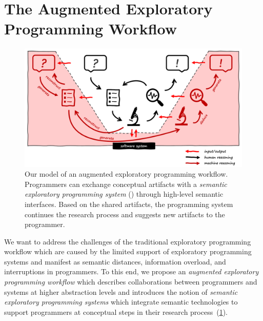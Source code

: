 
\section{The Augmented Exploratory Programming Workflow}
\label{sec:approach/workflow}

\begin{figure}
	\centering
	\includegraphics[width=\textwidth]{01_workflow/workflow.png}
	\caption[Our model of an \emph{augmented exploratory programming workflow}.]{
		Our model of an augmented exploratory programming workflow.
		Programmers can exchange conceptual artifacts with a \emph{semantic exploratory programming system} (\bold{\textcolor{red}{red}}) through high-level semantic interfaces.
		Based on the shared artifacts, the programming system continues the research process and suggests new artifacts to the programmer.
	}
	\label{fig:approach/workflow/workflow}
\end{figure}

We want to address the challenges of the traditional exploratory programming workflow which are caused by the limited support of exploratory programming systems and manifest as semantic distances, information overload, and interruptions in programmers.
To this end, we propose an \emph{augmented exploratory programming workflow} which describes collaborations between programmers and systems at higher abstraction levels and introduces the notion of \emph{semantic exploratory programming systems} which integrate semantic technologies to support programmers at conceptual steps in their research process~(\cref{fig:approach/workflow/workflow}).

